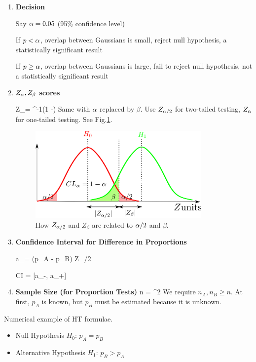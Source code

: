 \begin{enumerate}
\item {\bf Decision}

Say $\alpha=0.05$ (95\% confidence level)

If $p< \alpha$,  overlap between Gaussians is small, reject null hypothesis,
a statistically significant result

If $p \geq \alpha$, overlap between Gaussians is large, fail to reject null hypothesis, not a statistically significant result

\item {\bf $Z_\alpha, Z_\beta$  scores}

\beq
Z_\alp=
\Phi^{-1}(1 -\alp)
\eeq
Same with $\alpha$ replaced by $\beta$.
Use $Z_{\alpha/2}$ for two-tailed testing, $Z_\alpha$ for one-tailed testing. See Fig.\ref{fig-alp-beta-z}.

\begin{figure}[h!]
\centering
\includegraphics[width=3.5in]
{a-b-testing/alp-beta-z.png}
\caption{How $Z_{\alpha/2}$ and $Z_\beta$ are
related to $\alpha/2$ and $\beta$.}
\label{fig-alp-beta-z}
\end{figure}

\item {\bf Confidence Interval for Difference in Proportions} 

\beq
a_\pm = (p_A - p_B) \pm Z_{\alpha/2} 
\eeq

\beq
CI = [a_-, a_+]
\eeq



\item {\bf Sample Size 
(for Proportion Tests)}
\beq
n = 
^2
\eeq
We require $n_A, n_B\geq n$.
At first, $p_A$ is known, but $p_B$ 
must be
estimated because it is unknown.
\end{enumerate}

Numerical example of HT formulae.

\begin{itemize}
    \item Null Hypothesis \(H_0\): \( p_A = p_B \)
    \item Alternative Hypothesis \(H_1\): \( p_B > p_A \)
\end{itemize}

